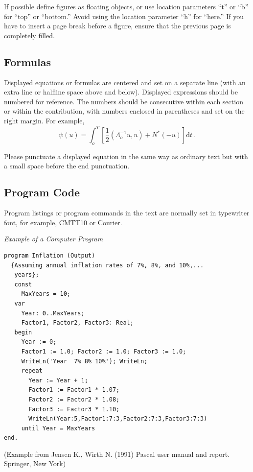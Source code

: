 \documentclass[runningheads]{llncs}
\begin{document}
If possible define figures as floating
objects, or use location parameters ``t'' or ``b'' for ``top'' or ``bottom.'' Avoid using the location
parameter ``h'' for ``here.'' If you have to insert a page break before a
figure, ensure that the previous page is completely filled.

\subsection{Formulas}

Displayed equations or formulas are centered and set on a separate
line (with an extra line or halfline space above and below). Displayed
expressions should be numbered for reference. The numbers should be
consecutive within each section or within the contribution,
with numbers enclosed in parentheses and set on the right margin.
For example,
%
\begin{equation}
  \psi (u) = \int_{o}^{T} \left[\frac{1}{2}
  \left(\Lambda_{o}^{-1} u,u\right) + N^{\ast} (-u)\right] \mathrm{d}t~.
  \label{equ:dt}
\end{equation}

Please punctuate a displayed equation in the same way as ordinary
text but with a small space before the end punctuation.


\subsection{Program Code}

Program listings or program commands in the text are normally set in
typewriter font, for example, CMTT10 or Courier.

\medskip

\noindent
{\it Example of a Computer Program}
\begin{verbatim}
program Inflation (Output)
  {Assuming annual inflation rates of 7%, 8%, and 10%,...
   years};
   const
     MaxYears = 10;
   var
     Year: 0..MaxYears;
     Factor1, Factor2, Factor3: Real;
   begin
     Year := 0;
     Factor1 := 1.0; Factor2 := 1.0; Factor3 := 1.0;
     WriteLn('Year  7% 8% 10%'); WriteLn;
     repeat
       Year := Year + 1;
       Factor1 := Factor1 * 1.07;
       Factor2 := Factor2 * 1.08;
       Factor3 := Factor3 * 1.10;
       WriteLn(Year:5,Factor1:7:3,Factor2:7:3,Factor3:7:3)
     until Year = MaxYears
end.
\end{verbatim}
%
\noindent
{\small (Example from Jensen K., Wirth N. (1991) Pascal user manual and
report. Springer, New York)}
\end{document}
